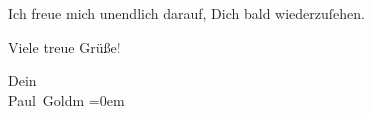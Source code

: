 \pstart
           Ich freue mich unendlich darauf, Dich bald wiederzuſehen.\pend
           
\pstart
           Viele treue Grüße\textcolor{gray}{!}\pend
           
\pstart
           Dein {\\[\baselineskip]}\spacefill\mbox{Paul Goldm}\pend
           \leftskip=0em{}\endnumbering{}  \newcommand{\dateiname}{L02820}\newcommand{\titel}{Paul Goldmann an Arthur Schnitzler, 1. 8. [1897]}\newcommand{\editorInnen}{Martin Anton Müller und Laura Untner}
